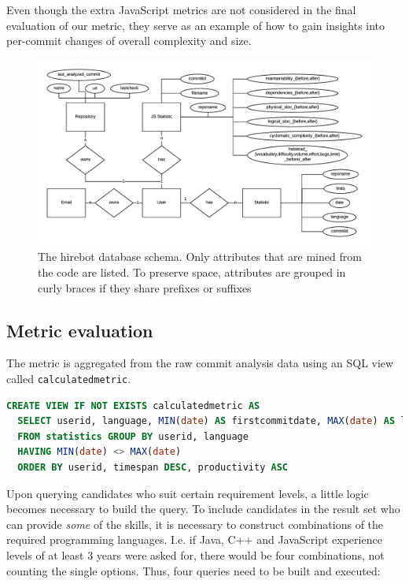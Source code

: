 Even though the extra JavaScript metrics are not considered in the final evaluation of our metric, they serve as an example of how to gain insights into per-commit changes of overall complexity and size.

\begin{figure}
  \centering
  \includegraphics[width=35em]{gfx/schema.png}
  \caption{The hirebot database schema. Only attributes that are mined from the code are listed. To preserve space, attributes are grouped in curly braces if they share prefixes or suffixes}
  \label{fig:schema}
\end{figure}

\subsection{Metric evaluation}
The metric is aggregated from the raw commit analysis data using an SQL view called \verb=calculatedmetric=.

\begin{lstlisting}[language=SQL, frame=false]
CREATE VIEW IF NOT EXISTS calculatedmetric AS
  SELECT userid, language, MIN(date) AS firstcommitdate, MAX(date) AS lastcommitdate, SUM(lines) AS linecount, COUNT(commitid) AS commitcount, julianday(MAX(date)) - julianday(MIN(date)) AS timespan, SUM(lines)/COUNT(commitid) AS averagecommitsize, (julianday(MAX(date)) - julianday(MIN(date)))/COUNT(commitid) AS productivity
  FROM statistics GROUP BY userid, language
  HAVING MIN(date) <> MAX(date)
  ORDER BY userid, timespan DESC, productivity ASC
\end{lstlisting}

Upon querying candidates who suit certain requirement levels, a little logic becomes necessary to build the query. To include candidates in the result set who can provide \textit{some} of the skills, it is necessary to construct combinations of the required programming languages. I.e. if Java, C++ and JavaScript experience levels of at least 3 years were asked for, there would be four combinations, not counting the single options.
Thus, four queries need to be built and executed:

